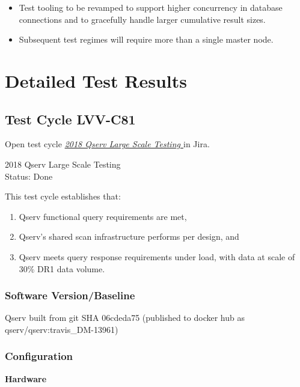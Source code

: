 \documentclass[DM,STR,toc]{lsstdoc}
\providecommand{\tightlist}{
  \setlength{\itemsep}{0pt}\setlength{\parskip}{0pt}}
\begin{document}
\begin{itemize}
\tightlist
\item
  Test tooling to be revamped to support higher concurrency in database
  connections and to gracefully handle larger cumulative result sizes.
\item
  Subsequent test regimes will require more than a single master node.
\end{itemize}


\newpage
\section{Detailed Test Results}
\label{sect:detailedtestresults}


  \subsection{Test Cycle LVV-C81 }

Open test cycle {\it \href{https://jira.lsstcorp.org/secure/Tests.jspa#/testrun/LVV-C81}{2018 Qserv Large Scale Testing
}} in Jira.

  2018 Qserv Large Scale Testing
\\
  Status: Done

  This test cycle establishes that:\\

\begin{enumerate}
\tightlist
\item
  Qserv functional query requirements are met,~
\item
  Qserv's shared scan infrastructure performs per design, and
\item
  Qserv meets query response requirements under load, with data at scale
  of 30\% DR1 data volume.
\end{enumerate}


  \subsubsection{Software Version/Baseline}
    Qserv built from git SHA 06cdeda75 (published to docker hub as
qserv/qserv:travis\_DM-13961)


  \subsubsection{Configuration}
    \textbf{Hardware}\\
\end{document}
